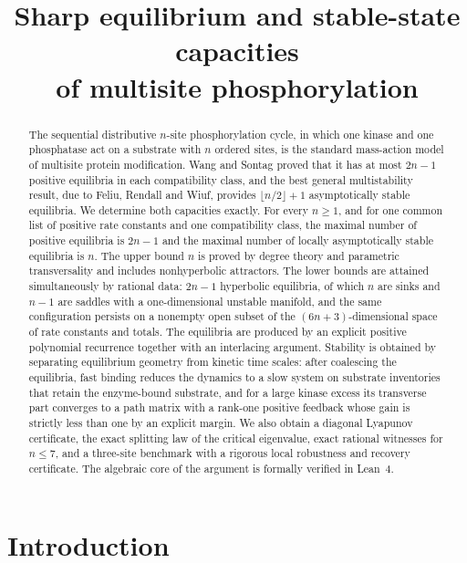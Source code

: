 \documentclass[11pt]{article}
\title{Sharp equilibrium and stable-state capacities\\ of multisite phosphorylation}
\author{}
\date{}
\theoremstyle{plain}
\theoremstyle{definition}
\theoremstyle{remark}
\numberwithin{equation}{section}
\begin{document}
\maketitle

\begin{abstract}
The sequential distributive \(n\)-site phosphorylation cycle, in which one kinase and one
phosphatase act on a substrate with \(n\) ordered sites, is the standard mass-action model of
multisite protein modification. Wang and Sontag proved that it has at most \(2n-1\) positive
equilibria in each compatibility class, and the best general multistability result, due to
Feliu, Rendall and Wiuf, provides \(\lfloor n/2\rfloor+1\) asymptotically stable equilibria. We
determine both capacities exactly. For every \(n\ge1\), and for one common list of positive rate
constants and one compatibility class, the maximal number of positive equilibria is \(2n-1\)
and the maximal number of locally asymptotically stable equilibria is \(n\). The upper bound
\(n\) is proved by degree theory and parametric transversality and includes nonhyperbolic
attractors. The lower bounds are attained simultaneously by rational data: \(2n-1\) hyperbolic
equilibria, of which \(n\) are sinks and \(n-1\) are saddles with a one-dimensional unstable
manifold, and the same configuration persists on a nonempty open subset of the
\((6n+3)\)-dimensional space of rate constants and totals. The equilibria are produced by an
explicit positive polynomial recurrence together with an interlacing argument. Stability is
obtained by separating equilibrium geometry from kinetic time scales: after coalescing the
equilibria, fast binding reduces the dynamics to a slow system on substrate inventories that
retain the enzyme-bound substrate, and for a large kinase excess its transverse part converges
to a path matrix with a rank-one positive feedback whose gain is strictly less than one by an
explicit margin. We also obtain a diagonal Lyapunov certificate, the exact splitting law of the
critical eigenvalue, exact rational witnesses for \(n\le7\), and a three-site benchmark with a
rigorous local robustness and recovery certificate. The algebraic core of the argument is
formally verified in Lean~4.
\end{abstract}

\section{Introduction}
\end{document}

